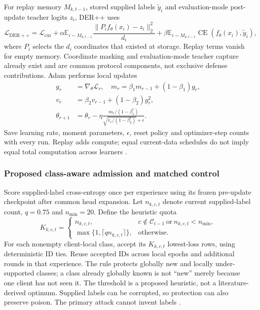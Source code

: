 \documentclass[10pt,a4paper]{article}
\newcommand{\CE}{\operatorname{CE}}
\begin{document}
For replay memory $M_{k,t-1}$, stored supplied labels $\widetilde y_i$ and evaluation-mode post-update teacher logits $z_i$, DER++ uses
\begin{equation}
\mathcal L_{\mathrm{DER++}}=\mathcal L_{\mathrm{cur}}
+\alpha\mathbb E_{i\sim M_{k,t-1}}
\frac{\|P_if_\theta(x_i)-z_i\|_2^2}{d_i}
+\beta\mathbb E_{i\sim M_{k,t-1}}\CE(f_\theta(x_i),\widetilde y_i),
\label{eq:der}
\end{equation}
where $P_i$ selects the $d_i$ coordinates that existed at storage. Replay terms vanish for empty memory. Coordinate masking and evaluation-mode teacher capture already exist and are common protocol components, not exclusive defense contributions. Adam performs local updates
\begin{equation}
\begin{aligned}
g_r&=\nabla_\theta\mathcal L_r,\quad m_r=\beta_1m_{r-1}+(1-\beta_1)g_r,\\
v_r&=\beta_2v_{r-1}+(1-\beta_2)g_r^2,\\
\theta_{r+1}&=\theta_r-\eta\frac{m_r/(1-\beta_1^r)}{\sqrt{v_r/(1-\beta_2^r)}+\epsilon}.
\end{aligned}
\end{equation}
Save learning rate, moment parameters, $\epsilon$, reset policy and optimizer-step counts with every run. Replay adds compute; equal current-data schedules do not imply equal total computation across learners \cite{repo}.

\subsubsection{Proposed class-aware admission and matched control}
Score supplied-label cross-entropy once per experience using its frozen pre-update checkpoint after common head expansion. Let $n_{k,c,t}$ denote current supplied-label count, $q=0.75$ and $n_{\min}=20$. Define the heuristic quota
\begin{equation}
K_{k,c,t}=
\begin{cases}
n_{k,c,t},&c\notin\mathcal C_{t-1}\ \text{or}\ n_{k,c,t}<n_{\min},\\
\max\{1,\lceil qn_{k,c,t}\rceil\},&\text{otherwise}.
\end{cases}
\label{eq:admission}
\end{equation}
For each nonempty client-local class, accept its $K_{k,c,t}$ lowest-loss rows, using deterministic ID ties. Reuse accepted IDs across local epochs and additional rounds in that experience. The rule protects globally new and locally under-supported classes; a class already globally known is not ``new'' merely because one client has not seen it. The threshold is a proposed heuristic, not a literature-derived optimum. Supplied labels can be corrupted, so protection can also preserve poison. The primary attack cannot invent labels \cite{guo,repo}.
\end{document}

